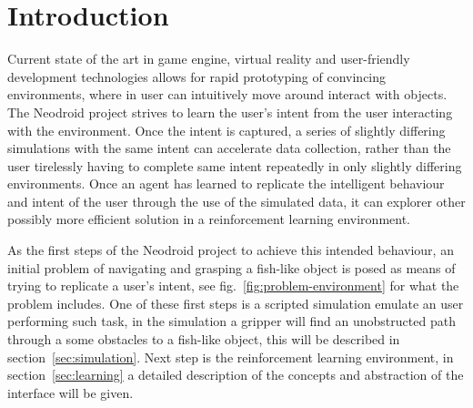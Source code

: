 \section{Introduction}




Current state of the art in game engine, virtual reality and user-friendly development technologies allows for rapid prototyping of convincing environments, where in user can intuitively move around interact with objects. The Neodroid project strives to learn the user's intent from the user interacting with the environment. Once the intent is captured, a series of slightly differing simulations with the same intent can accelerate data collection, rather than the user tirelessly having to complete same intent repeatedly in only slightly differing environments. 
Once an agent has learned to replicate the intelligent behaviour and intent of the user through the use of the simulated data, it can explorer other possibly more efficient solution in a reinforcement learning environment.

As the first steps of the Neodroid project to achieve this intended behaviour, an initial problem of navigating and grasping a fish-like object is posed as means of trying to replicate a user's intent, see fig.~\ref{fig:problem-environment} for what the problem includes. One of these first steps is a scripted simulation emulate an user performing such task, in the simulation a gripper will find an unobstructed path through a some obstacles to a fish-like object, this will be described in section~\ref{sec:simulation}. Next step is the reinforcement learning environment, in section~\ref{sec:learning} a detailed description of the concepts and abstraction of the interface will be given.

